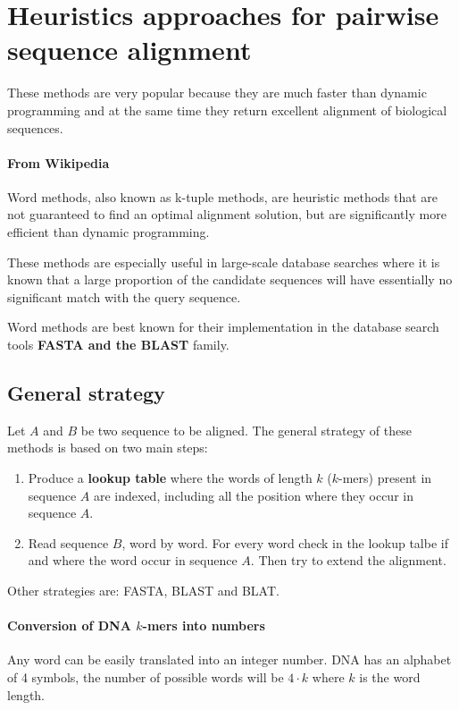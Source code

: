 \newpage
\section{Heuristics approaches for pairwise sequence alignment}
These methods are very popular because they are much faster than dynamic
programming and at the same time they return excellent alignment of biological
sequences.

\paragraph*{From Wikipedia}
Word methods, also known as k-tuple methods, are heuristic
methods that are not guaranteed to find an optimal alignment solution,
but are  significantly more efficient than dynamic programming.

These methods are especially useful in large-scale database searches where
it is known that a large proportion of the candidate sequences will
have essentially no significant match with the query sequence.

Word methods are best known for their implementation in the database
search tools \textbf{FASTA and the BLAST} family.

\subsection{General strategy}

Let $A$ and $B$ be two sequence to be aligned. The general strategy of these
methods is based on two main steps:

\begin{enumerate}
  \item Produce a \textbf{lookup table} where the words of length $k$
($k$-mers) present in sequence $A$ are indexed, including all the position
where they occur in sequence $A$.
  \item Read sequence $B$, word by word. For every word check in the lookup
talbe if and where the word occur in sequence $A$. Then try to extend the
alignment.
\end{enumerate}

Other strategies are: FASTA, BLAST and BLAT.

\paragraph*{Conversion of DNA $k$-mers into numbers}

Any word can be easily translated into an integer number.
DNA has an alphabet of 4 symbols, the number of possible words will be $4
\cdot k$ where $k$ is the word length.

